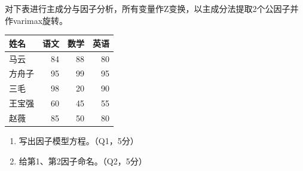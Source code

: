 
\par\addvspace{6pt}\noindent\begin{minipage}{\linewidth}


对下表进行主成分与因子分析，所有变量作Z变换，以主成分法提取2个公因子并作varimax旋转。

\begin{center}\small\setlength{\tabcolsep}{4pt}\renewcommand{\arraystretch}{1.18}\begin{tabular}{@{}lrrr@{}}
\toprule
姓名 & 语文 & 数学 & 英语 \\
\midrule

马云 & 84 & 88 & 80 \\
方舟子 & 95 & 99 & 95 \\
三毛 & 98 & 20 & 90 \\
王宝强 & 60 & 45 & 55 \\
赵薇 & 85 & 50 & 80 \\
\bottomrule\end{tabular}\end{center}

\begin{enumerate}
\def\labelenumi{\arabic{enumi}.}
\tightlist
\item
  写出因子模型方程。（Q1，5分）
\item
  给第1、第2因子命名。（Q2，5分）
\end{enumerate}



\end{minipage}\par\vspace{4pt}

